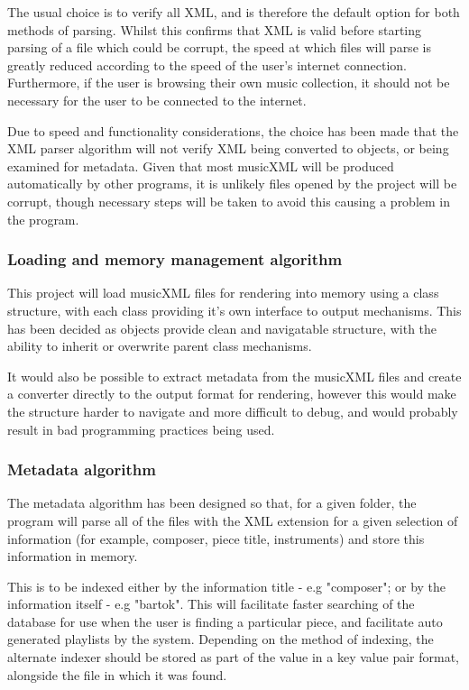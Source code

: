 The usual choice is to verify all XML, and is therefore the default option for both methods of parsing. Whilst this confirms that XML is valid before starting parsing of a file which could be corrupt, the speed at which files will parse is greatly reduced according to the speed of the user's internet connection.
Furthermore, if the user is browsing their own music collection, it should not be necessary for the user to be connected to the internet.

Due to speed and functionality considerations, the choice has been made that the XML parser algorithm will not verify XML being converted to objects, or being examined for metadata. Given that most musicXML will be produced automatically by other programs, it is unlikely files opened by the project will be corrupt, though necessary steps will be taken to avoid this causing a problem in the program.

\subsubsection{Loading and memory management algorithm}
This project will load musicXML files for rendering into memory using a class structure, with each class providing it's own interface to output mechanisms. This has been decided as objects provide clean and navigatable structure, with the ability to inherit or overwrite parent class mechanisms.

It would also be possible to extract metadata from the musicXML files and create a converter directly to the output format for rendering, however this would make the structure harder to navigate and more difficult to debug, and would probably result in bad programming practices being used.



\subsubsection{Metadata algorithm}
The metadata algorithm has been designed so that, for a given folder, the program will parse all of the files with the XML extension for a given selection of information (for example, composer, piece title, instruments) and store this information in memory. 

This is to be indexed either by the information title - e.g "composer"; or by the information itself - e.g "bartok". This will facilitate faster searching of the database for use when the user is finding a particular piece, and facilitate auto generated playlists by the system. Depending on the method of indexing, the alternate indexer should be stored as part of the value in a key value pair format, alongside the file in which it was found.

